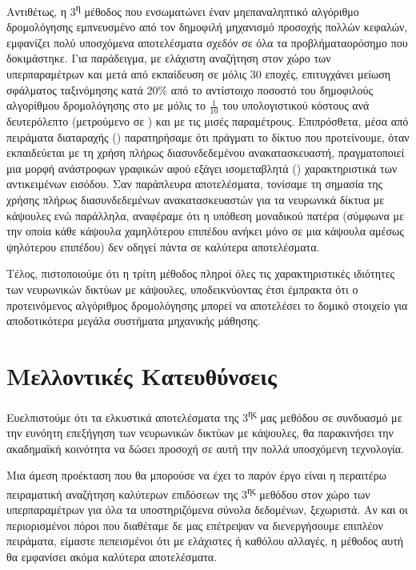 Αντιθέτως, η 3\textsuperscript{η} μέθοδος που ενσωματώνει έναν μη\textendash επαναληπτικό αλγόριθμο δρομολόγησης εμπνευσμένο από τον δημοφιλή μηχανισμό προσοχής πολλών κεφαλών, εμφανίζει πολύ υποσχόμενα αποτελέσματα σχεδόν σε όλα τα προβλήματα\textendash ορόσημο που δοκιμάστηκε. Για παράδειγμα, με ελάχιστη αναζήτηση στον χώρο των υπερπαραμέτρων και μετά από εκπαίδευση σε μόλις 30 εποχές, επιτυγχάνει μείωση σφάλματος ταξινόμησης κατά 20\% από το αντίστοιχο ποσοστό του δημοφιλούς αλγορίθμου δρομολόγησης  στο   με μόλις το $\frac{1}{10}$ του υπολογιστικού κόστους ανά δευτερόλεπτο (μετρούμενο σε ) και με τις μισές παραμέτρους. Επιπρόσθετα, μέσα από πειράματα διαταραχής () παρατηρήσαμε ότι πράγματι το δίκτυο που προτείνουμε, όταν εκπαιδεύεται με τη χρήση πλήρως διασυνδεδεμένου ανακατασκευαστή, πραγματοποιεί μια μορφή ανάστροφων γραφικών αφού εξάγει ισομεταβλητά () χαρακτηριστικά  των αντικειμένων εισόδου. Σαν παράπλευρα αποτελέσματα, τονίσαμε τη σημασία της χρήσης πλήρως διασυνδεδεμένων ανακατασκευαστών για τα νευρωνικά δίκτυα με κάψουλες ενώ παράλληλα, αναφέραμε ότι η υπόθεση μοναδικού πατέρα (σύμφωνα με την οποία κάθε κάψουλα χαμηλότερου επιπέδου ανήκει μόνο σε μια κάψουλα αμέσως ψηλότερου επιπέδου) δεν οδηγεί πάντα σε καλύτερα αποτελέσματα.\par

Τέλος, πιστοποιούμε ότι η τρίτη μέθοδος πληροί όλες τις χαρακτηριστικές ιδιότητες των νευρωνικών δικτύων με κάψουλες, υποδεικνύοντας έτσι έμπρακτα ότι ο προτεινόμενος αλγόριθμος δρομολόγησης μπορεί να αποτελέσει το δομικό στοιχείο για αποδοτικότερα μεγάλα συστήματα μηχανικής μάθησης.

\section{Μελλοντικές Κατευθύνσεις}
Ευελπιστούμε ότι τα ελκυστικά αποτελέσματα της 3\textsuperscript{ης} μας μεθόδου σε συνδυασμό με την ευνόητη επεξήγηση των νευρωνικών δικτύων με κάψουλες, θα παρακινήσει την ακαδημαϊκή κοινότητα να δώσει προσοχή σε αυτή την πολλά υποσχόμενη τεχνολογία.\par

Μια άμεση προέκταση που θα μπορούσε να έχει το παρόν έργο είναι η περαιτέρω πειραματική αναζήτηση καλύτερων επιδόσεων της 3\textsuperscript{ης} μεθόδου στον χώρο των υπερπαραμέτρων για όλα τα υποστηριζόμενα σύνολα δεδομένων, ξεχωριστά. Αν και οι περιορισμένοι πόροι που διαθέταμε δε μας επέτρεψαν να διενεργήσουμε επιπλέον πειράματα, είμαστε πεπεισμένοι ότι  με ελάχιστες ή καθόλου αλλαγές, η μέθοδος αυτή θα εμφανίσει ακόμα καλύτερα αποτελέσματα.\par

